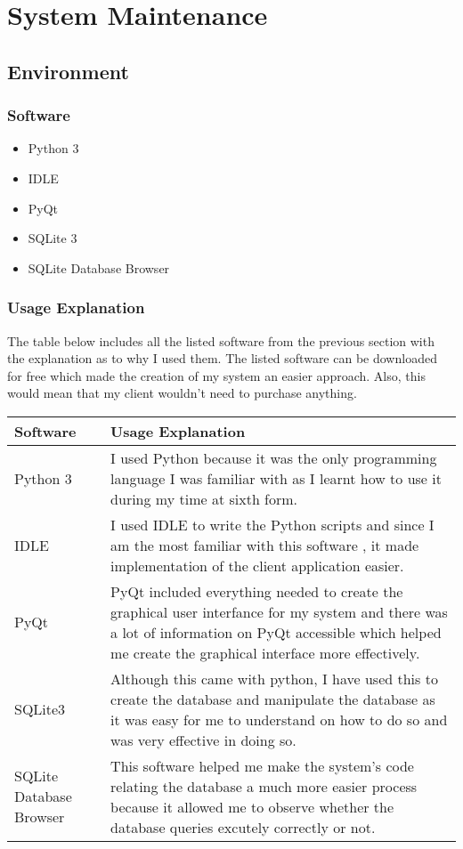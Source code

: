 \chapter{System Maintenance}

\section{Environment}

\subsection{Software}

\begin {itemize}
	\item Python 3
	\item IDLE
	\item PyQt
	\item SQLite 3
	\item SQLite Database Browser
	
\end {itemize}

\subsection{Usage Explanation}


The table below includes all the listed software from the previous section with the explanation as to why I used them.
The listed software can be downloaded for free which made the creation of my system an easier approach. Also, this would mean that my client wouldn't need to purchase anything.

\begin{center}
\begin{tabular}{|p{4cm}|p{8.5cm}|}
\hline
\textbf{Software} & \textbf{Usage Explanation} \\ \hline

Python 3 & I used Python because it was the only programming language I was familiar with as I learnt how to use it during my time at sixth form. \\ \hline
IDLE & I used IDLE to write the Python scripts and since I am the most familiar with this software , it made implementation of the client application easier. \\ \hline
PyQt& PyQt included everything needed to create the graphical user interfance for my system and there was a lot of information on PyQt accessible which helped me create the graphical interface more effectively. \\ \hline
SQLite3 & Although this came with python, I have used this to create the database and manipulate the database as it was  easy for me to understand on how to do so and was very effective in doing so. \\ \hline
SQLite Database Browser & This software helped me make the system's code relating the database a much more easier process because it allowed me to observe whether the database queries excutely correctly or not. \\ \hline

\end{tabular}
\end{center}

